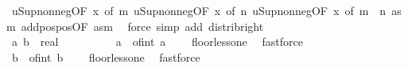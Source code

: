 \begin{isabellebody}
\ u{\isacharunderscore}{\kern0pt}Sup{\isacharunderscore}{\kern0pt}nonneg{\isacharbrackleft}{\kern0pt}OF\ x{\isacharparenleft}{\kern0pt}{}{\isacharparenright}{\kern0pt}{\isacharcomma}{\kern0pt}\ of\ m{\isacharbrackright}{\kern0pt}\ u{\isacharunderscore}{\kern0pt}Sup{\isacharunderscore}{\kern0pt}nonneg{\isacharbrackleft}{\kern0pt}OF\ x{\isacharparenleft}{\kern0pt}{}{\isacharparenright}{\kern0pt}{\isacharcomma}{\kern0pt}\ of\ n{\isacharbrackright}{\kern0pt}\ u{\isacharunderscore}{\kern0pt}Sup{\isacharunderscore}{\kern0pt}nonneg{\isacharbrackleft}{\kern0pt}OF\ x{\isacharparenleft}{\kern0pt}{}{\isacharparenright}{\kern0pt}{\isacharcomma}{\kern0pt}\ of\ {\isachardoublequoteopen}m\ {\isacharplus}{\kern0pt}\ n{\isachardoublequoteclose}{\isacharbrackright}{\kern0pt}\ asm\ add{\isacharunderscore}{\kern0pt}pos{\isacharunderscore}{\kern0pt}pos{\isacharbrackleft}{\kern0pt}OF\ asm{\isacharbrackright}{\kern0pt}\ \isamarkupfalse%
\ {\isacharparenleft}{\kern0pt}force\ simp\ add{\isacharcolon}{\kern0pt}\ distrib{\isacharunderscore}{\kern0pt}right{\isacharparenright}{\kern0pt}{\isacharplus}{\kern0pt}\isanewline
\ \ \ \ \ \ \isamarkupfalse%
\ \isanewline
\ \ \ \ \ \ \isacommand{{\isacharbraceleft}{\kern0pt}}\isamarkupfalse%
\isanewline
\ \ \ \ \ \ \ \ \isamarkupfalse%
\ a\ b\ {\isacharcolon}{\kern0pt}{\isacharcolon}{\kern0pt}\ real\isanewline
\ \ \ \ \ \ \ \ \isamarkupfalse%
\ {\isachardoublequoteopen}a\ {\isacharminus}{\kern0pt}\ of{\isacharunderscore}{\kern0pt}int\ {\isasymlfloor}a{\isasymrfloor}\ {\isasymin}\ {\isacharbraceleft}{\kern0pt}{}{\isachardot}{\kern0pt}{\isachardot}{\kern0pt}{\isacharless}{\kern0pt}{}{\isacharbraceright}{\kern0pt}{\isachardoublequoteclose}\ \isamarkupfalse%
\ floor{\isacharunderscore}{\kern0pt}less{\isacharunderscore}{\kern0pt}one\ \isamarkupfalse%
\ fastforce\isanewline
\ \ \ \ \ \ \ \ \isamarkupfalse%
\ \isamarkupfalse%
\ {\isachardoublequoteopen}b\ {\isacharminus}{\kern0pt}\ of{\isacharunderscore}{\kern0pt}int\ {\isasymlfloor}b{\isasymrfloor}\ {\isasymin}\ {\isacharbraceleft}{\kern0pt}{}{\isachardot}{\kern0pt}{\isachardot}{\kern0pt}{\isacharless}{\kern0pt}{}{\isacharbraceright}{\kern0pt}{\isachardoublequoteclose}\ \isamarkupfalse%
\ floor{\isacharunderscore}{\kern0pt}less{\isacharunderscore}{\kern0pt}one\ \isamarkupfalse%
\ fastforce\isanewline
\ \ \ \ \ \ \ \ \isamarkupfalse%

\end{isabellebody}
